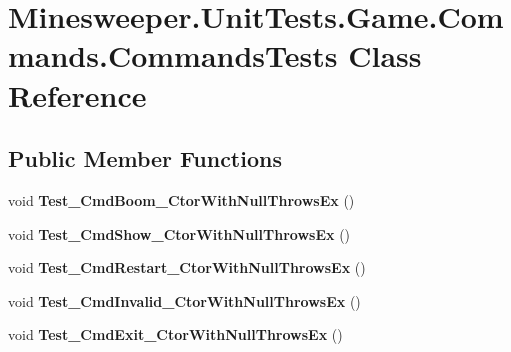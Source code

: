 \hypertarget{class_minesweeper_1_1_unit_tests_1_1_game_1_1_commands_1_1_commands_tests}{\section{Minesweeper.\+Unit\+Tests.\+Game.\+Commands.\+Commands\+Tests Class Reference}
\label{class_minesweeper_1_1_unit_tests_1_1_game_1_1_commands_1_1_commands_tests}
}
\subsection*{Public Member Functions}
\begin{DoxyCompactItemize}
\item 
\hypertarget{class_minesweeper_1_1_unit_tests_1_1_game_1_1_commands_1_1_commands_tests_a1bd4551d35bee81e4550e1eda22466ec}{void {\bfseries Test\+\_\+\+Cmd\+Boom\+\_\+\+Ctor\+With\+Null\+Throws\+Ex} ()}\label{class_minesweeper_1_1_unit_tests_1_1_game_1_1_commands_1_1_commands_tests_a1bd4551d35bee81e4550e1eda22466ec}

\item 
\hypertarget{class_minesweeper_1_1_unit_tests_1_1_game_1_1_commands_1_1_commands_tests_afcae14159d72a59ca53366145bd32c30}{void {\bfseries Test\+\_\+\+Cmd\+Show\+\_\+\+Ctor\+With\+Null\+Throws\+Ex} ()}\label{class_minesweeper_1_1_unit_tests_1_1_game_1_1_commands_1_1_commands_tests_afcae14159d72a59ca53366145bd32c30}

\item 
\hypertarget{class_minesweeper_1_1_unit_tests_1_1_game_1_1_commands_1_1_commands_tests_a9bcd3fb509b659db7f9c5dc96897e5a9}{void {\bfseries Test\+\_\+\+Cmd\+Restart\+\_\+\+Ctor\+With\+Null\+Throws\+Ex} ()}\label{class_minesweeper_1_1_unit_tests_1_1_game_1_1_commands_1_1_commands_tests_a9bcd3fb509b659db7f9c5dc96897e5a9}

\item 
\hypertarget{class_minesweeper_1_1_unit_tests_1_1_game_1_1_commands_1_1_commands_tests_a870d78a61e7d6cfb10e0ad4ea1d13c03}{void {\bfseries Test\+\_\+\+Cmd\+Invalid\+\_\+\+Ctor\+With\+Null\+Throws\+Ex} ()}\label{class_minesweeper_1_1_unit_tests_1_1_game_1_1_commands_1_1_commands_tests_a870d78a61e7d6cfb10e0ad4ea1d13c03}

\item 
\hypertarget{class_minesweeper_1_1_unit_tests_1_1_game_1_1_commands_1_1_commands_tests_a7e27972f284327380527208834fa903e}{void {\bfseries Test\+\_\+\+Cmd\+Exit\+\_\+\+Ctor\+With\+Null\+Throws\+Ex} ()}\label{class_minesweeper_1_1_unit_tests_1_1_game_1_1_commands_1_1_commands_tests_a7e27972f284327380527208834fa903e}


\end{DoxyCompactItemize}
